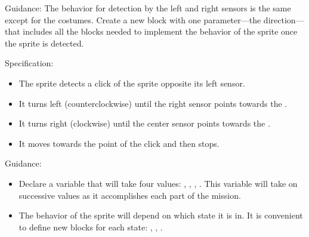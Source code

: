 Guidance: The behavior for detection by the left and right sensors is
the same except for the costumes. Create a new block
 with one parameter---the direction---that
includes all the blocks needed to implement the behavior of the
 sprite once the  sprite is detected.

\newpage



Specification:

\begin{itemize}
\item The  sprite detects a click of the  sprite
opposite its left sensor.
\item It turns left (counterclockwise) until the right sensor points
towards the .
\item It turns right (clockwise) until the center sensor points towards
the .
\item It moves towards the point of the click and then stops.
\end{itemize}

Guidance:

\begin{itemize}

\item Declare a variable that will take four values:
, , , . This variable
will take on successive values as it accomplishes each part of the
mission.

\item The behavior of the  sprite will depend on which state
it is in. It is convenient to define new blocks for each state:
, , .

\end{itemize}
